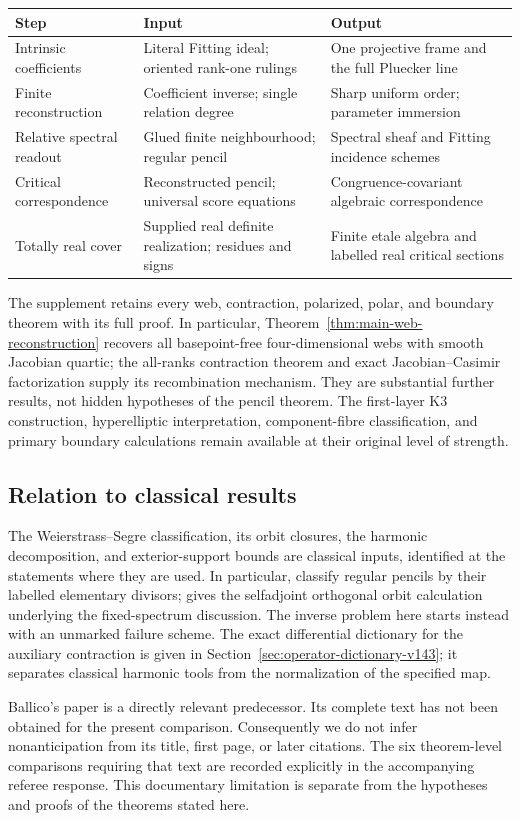 \begin{center}
\small
\begin{tabular}{@{}p{.22\linewidth}p{.33\linewidth}p{.37\linewidth}@{}}
\toprule
Step & Input & Output \\
\midrule
Intrinsic coefficients & Literal Fitting ideal; oriented rank-one
rulings & One projective frame and the full Pluecker line \\[3pt]
Finite reconstruction & Coefficient inverse; single relation degree &
Sharp uniform order; parameter immersion \\[3pt]
Relative spectral readout & Glued finite neighbourhood; regular pencil &
Spectral sheaf and Fitting incidence schemes \\[3pt]
Critical correspondence & Reconstructed pencil; universal score equations &
Congruence-covariant algebraic correspondence \\[3pt]
Totally real cover & Supplied real definite realization; residues and signs &
Finite etale algebra and labelled real critical sections \\
\bottomrule
\end{tabular}
\end{center}

The supplement retains every web, contraction, polarized, polar,
and boundary theorem with its full proof.  In particular,
Theorem~\ref{thm:main-web-reconstruction} recovers all basepoint-free
four-dimensional webs with smooth Jacobian quartic; the all-ranks
contraction theorem and exact Jacobian--Casimir factorization supply
its recombination mechanism.  They are substantial further results,
not hidden hypotheses of the pencil theorem.  The first-layer K3
construction, hyperelliptic interpretation, component-fibre
classification, and primary boundary calculations remain available
at their original level of strength.

\subsection{Relation to classical results}
The Weierstrass--Segre classification, its orbit closures, the harmonic
decomposition, and exterior-support bounds are classical inputs,
identified at the statements where they are used.  In particular,
\cite[Theorem~1.1 and Corollary~2.1]{FevolaMandelshtamSturmfels}
classify regular pencils by their labelled elementary divisors;
\cite[equation (2)]{TrevisiolSymmetric} gives the selfadjoint orthogonal orbit
calculation underlying the fixed-spectrum discussion.  The inverse
problem here starts instead with an unmarked failure scheme.
The exact differential dictionary for the auxiliary contraction is
given in Section~\ref{sec:operator-dictionary-v143}; it separates
classical harmonic tools from the normalization of the specified map.

Ballico's paper \cite{Ballico93} is a directly relevant predecessor.
Its complete text has not been obtained for the present comparison.
Consequently we do not infer nonanticipation from its title, first
page, or later citations.  The six theorem-level comparisons requiring
that text are recorded explicitly in the accompanying referee response.
This documentary limitation is separate from the hypotheses and proofs
of the theorems stated here.

